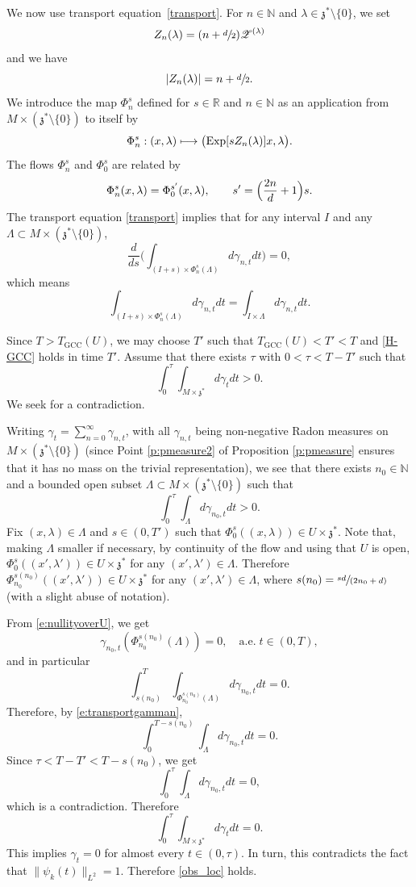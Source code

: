 \documentclass[JEP,XML,SOM,Unicode,published]{cedram}
\let\mathcal\mathscr
\newcommand\mto{\mathchoice{\longmapsto}{\mapsto}{\mapsto}{\mapsto}}
\newcommand{\spfrac}[2]{\sfrac{#1}{(#2)}}
\newcommand{\GCC}{\mathrm{GCC}}
\DeclareMathOperator{\Exp}{Exp}
\theoremstyle{plain}
\theoremstyle{definition}
\def\R{{\mathbb R}}
\def\N{{\mathbb N}}
\begin{document}
We now use transport equation~\eqref{transport}.
For $n\in\N$ and $\lambda\in\mathfrak z^*\setminus \{0\}$, we set
\[
Z_n(\lambda)= (n+\sfrac d 2) {\mathcal Z}^{(\lambda)}
\]
and we have
\[
| Z_n(\lambda)|= n+\sfrac{d}{2}.
\]
We
introduce the map $\Phi^s_n$ defined for $s\in\R$ and $n\in\N$ as an application from $M\times (\mathfrak z^*\setminus\{0\})$ to itself by
\[
\Phi^s_n: (x,\lambda)\mto \bigl(\Exp[s Z_n(\lambda)]x,\lambda\bigr).
\]
The flows $\Phi_n^s$ and $\Phi_0^s$ are related by
\[
\Phi_n^s(x,\lambda)=\Phi_0^{s'}(x,\lambda), \qquad s'=\Bigl(\frac{2n}{d}+1 \Bigr)s.
\]
The transport equation \eqref{transport} implies that for any interval $I$ and any \hbox{$\Lambda\!\subset\!M\!\!\times\!\!(\mathfrak z^*\!\setminus\!\{0\})$},
\[
\frac d {ds} \biggl(\int _{(I+s)\times \Phi^{s}_n (\Lambda)} d\gamma_{n,t} dt \biggr) =0,
\]
which means
\begin{equation} \label{e:transportgamman}
\int _{(I+s)\times \Phi^{s}_n (\Lambda)} d\gamma_{n,t} dt= \int _{I\times \Lambda} d\gamma_{n,t} dt.
\end{equation}

Since $T>T_\GCC (U)$, we may choose $T'$ such that $T_\GCC (U)<T'<T$ and \eqref{H-GCC} holds in time $T'$. Assume that there exists $\tau$ with $0<\tau<T-T'$ such that
\begin{equation*}%
\int_0^{\tau} \int_{M\times \mathfrak z^*} d\gamma_{t} dt >0.
\end{equation*}
We seek for a contradiction.

Writing $\gamma_t=\sum_{n=0}^\infty \gamma_{n,t}$, with all $\gamma_{n,t}$ being non-negative Radon measures on \hbox{$M\times (\mathfrak z^*\setminus \{0\})$} (since Point \eqref{p:pmeasure2} of Proposition \ref{p:pmeasure} ensures that it has no mass on the trivial representation), we see that there exists $n_0\in\N$ and a bounded open subset $\Lambda\subset M\times (\mathfrak z^*\setminus\{0\})$ such that
\[
\int_0^{\tau} \int_{\Lambda} d\gamma_{n_0,t} dt >0.
\]
Fix $(x,\lambda)\in \Lambda$ and $s\in (0,T')$ such that $\Phi^{s}_0 ((x,\lambda))\in U\times \mathfrak z^*$. Note that, making $\Lambda$ smaller if necessary, by continuity of the flow and using that $U$ is open, $\Phi^{s}_0 ((x',\lambda'))\in U\times \mathfrak z^*$ for any $(x',\lambda')\in\Lambda$. Therefore $\Phi^{s(n_0)}_{n_0} ((x',\lambda'))\in U\times \mathfrak z^*$ for any $(x',\lambda')\in\Lambda$, where $s(n_0)=\spfrac{sd}{2n_0+d}$ (with a slight abuse of notation).

From \eqref{e:nullityoverU}, we get
\[
\gamma_{n_0,t} (\Phi^{s(n_0)}_{n_0} (\Lambda))=0,\quad \text{a.e.}\; t\in(0,T),
\]
and in particular
\[
\int_{s(n_0)}^T \int_{ \Phi^{s(n_0)}_{n_0}(\Lambda)} d\gamma_{n_0,t} dt =0.
\]
Therefore, by \eqref{e:transportgamman},
\[
\int_0^{T-s(n_0)} \int_{\Lambda} d\gamma_{n_0,t} dt =0.
\]
Since $\tau<T-T'<T-s(n_0)$, we get
\[
\int_0^{\tau} \int_{\Lambda} d\gamma_{n_0,t} dt =0,
\]
which is a contradiction.
Therefore
\begin{equation*}
\int_0^{\tau} \int_{M\times \mathfrak z^*} d\gamma_{t} dt =0.
\end{equation*}
This implies $\gamma_t=0$ for almost every $t\in (0,\tau)$. In turn, this contradicts the fact that $\| \psi_k(t)\|_{L^2}=1$. Therefore \eqref{obs_loc} holds.
\end{document}
